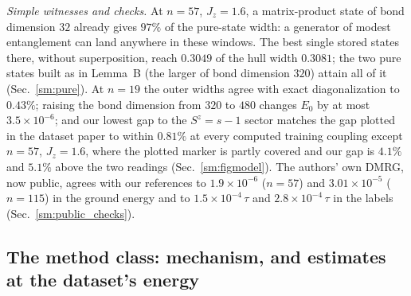 \documentclass[aps,prx,onecolumn,10pt,nofootinbib,longbibliography,floatfix]{revtex4-2}
\theoremstyle{remark}
\newcommand{\Jz}{J_z}
\begin{document}
\emph{Simple witnesses and checks.} At $n=57$, $\Jz=1.6$, a matrix-product state of bond dimension $32$ already gives %
$97\%$ of the pure-state width: a generator of modest entanglement can land anywhere in these windows. The best single %
stored states there, without superposition, reach $0.3049$ of the hull width $0.3081$; the two pure states built as in %
Lemma~B (the larger of bond dimension $320$) attain all of it (Sec.~\ref{sm:pure}). At $n=19$ the %
outer widths agree with exact diagonalization to $0.43\%$; raising the bond dimension from $320$ to $480$ changes %
$E_0$ by at most $3.5\times10^{-6}$; and our lowest gap to the $S^z=s-1$ sector matches the gap plotted in the %
dataset paper to within $0.81\%$ at every computed training coupling except $n=57$, $\Jz=1.6$, where the plotted marker %
is partly covered and our gap is $4.1\%$ and $5.1\%$ above the two readings (Sec.~\ref{sm:figmodel}). The authors' %
own DMRG, now public, agrees with our references to $1.9\times10^{-6}$ ($n=57$) and $3.01\times10^{-5}$ ($n=115$) in the %
ground energy and to $1.5\times10^{-4}\,\tau$ and $2.8\times10^{-4}\,\tau$ in the labels (Sec.~\ref{sm:public_checks}). %

\subsection{The method class: mechanism, and estimates at the dataset's energy}
\end{document}

